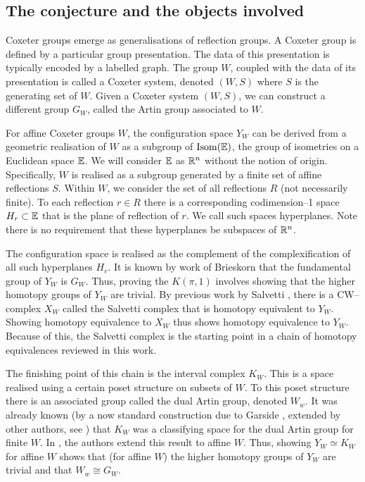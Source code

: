 \subsection{The conjecture and the objects involved}
\label{sec:section_example_1}
Coxeter groups emerge as generalisations of reflection groups. A Coxeter group is defined by a particular group presentation. The data of this presentation is typically encoded by a labelled graph. The group $W$, coupled with the data of its presentation is called a Coxeter system, denoted $(W,S)$ where $S$ is the generating set of $W$. Given a Coxeter system $(W,S)$, we can construct a different group $G_W$, called the Artin group associated to $W$.

For affine Coxeter groups $W$, the configuration space $Y_W$ can be derived from a geometric realisation of $W$ as a subgroup of $\operatorname{Isom}(\mathbb{E})$, the group of isometries on a Euclidean space $\mathbb{E}$. We will consider $\mathbb{E}$ as $\mathbb{R}^n$ without the notion of origin. Specifically, $W$ is realised as a subgroup generated by a finite set of affine reflections $S$. Within $W$, we consider the set of all reflections $R$ (not necessarily finite). To each reflection $r \in R$ there is a corresponding codimension--1 space $H_r \subset \mathbb{E}$ that is the plane of reflection of $r$. We call such spaces hyperplanes. Note there is no requirement that these hyperplanes be subspaces of $\mathbb{R}^n$.

The configuration space is realised as the complement of the complexification of all such hyperplanes $H_r$. It is known by work of Brieskorn \cite{brieskorn_fundamentalgruppe_1971} that the fundamental group of $Y_W$ is $G_W$. Thus, proving the $K(\pi,1)$ involves showing that the higher homotopy groups of $Y_W$ are trivial. By previous work by Salvetti \cite{salvetti_topology_1987,salvetti_homotopy_1994}, there is a CW--complex $X_W$ called the Salvetti complex that is homotopy equivalent to $Y_W$. Showing homotopy equivalence to $X_W$ thus shows homotopy equivalence to $Y_W$. Because of this, the Salvetti complex is the starting point in a chain of homotopy equivalences reviewed in this work.

The finishing point of this chain is the interval complex $K_W$. This is a space realised using a certain poset structure on subsets of $W$. To this poset structure there is an associated group called the dual Artin group, denoted $W_w$. It was already known (by a now standard construction due to Garside \cite{garside_braid_1969}, extended by other authors, see \cite{charney_etal_bestvina_2002}) that $K_W$ was a classifying space for the dual Artin group for finite $W$. In \cite{paolini_salvetti_kpi1_2021}, the authors extend this result to affine $W$. Thus, showing $Y_W \simeq K_W$ for affine $W$ shows that (for affine $W$) the higher homotopy groups of $Y_W$ are trivial and that $W_w \cong G_W$.

